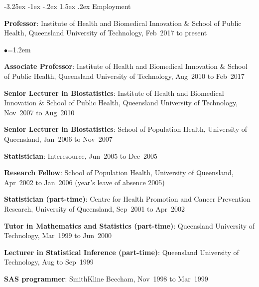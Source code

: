 \documentclass[a4paper,11pt]{article}
\makeatletter
\renewcommand\subsection{\@startsection{subsection}{2}{\z@}%
                                       {-3.25ex \@plus -1ex \@minus -.2ex}%
                                       {1.5ex \@plus .2ex}%
                                   {\normalfont\normalsize\bfseries\color{blue}}}
\renewcommand{\labelitemi}{$\bullet$}
\makeatother
\begin{document}
\begin{raggedright}
\subsection{Employment}

\textbf{Professor}: Institute of Health and Biomedical Innovation \& School of Public Health, Queensland University of Technology, Feb~2017 to present

\begin{list}{\labelitemi}{\leftmargin=1.2em}\addtolength{\itemsep}{-0.5\baselineskip}
\item \textbf{Associate Professor}: Institute of Health and Biomedical Innovation \& School of Public Health, Queensland University of Technology, Aug~2010 to Feb~2017

\item \textbf{Senior Lecturer in Biostatistics}: Institute of Health and Biomedical Innovation \& School of Public Health, Queensland University of Technology, Nov~2007 to Aug~2010

\item \textbf{Senior Lecturer in Biostatistics}: School of Population Health, University of Queensland, Jan~2006 to Nov~2007

\item \textbf{Statistician}: Interesource, Jun~2005 to Dec~2005

\item \textbf{Research Fellow}: School of Population Health, University of Queensland, Apr~2002 to Jan~2006 (year's leave of absence 2005)

\item \textbf{Statistician (part-time)}: Centre for Health Promotion and Cancer Prevention Research, University of Queensland, Sep~2001 to Apr~2002

\item \textbf{Tutor in Mathematics and Statistics (part-time)}: Queensland University of Technology, Mar~1999 to Jun~2000

\item \textbf{Lecturer in Statistical Inference (part-time)}: Queensland University of Technology, Aug to Sep~1999


\item \textbf{SAS programmer}: SmithKline Beecham, Nov~1998 to Mar~1999


\end{list}
\end{raggedright}
\end{document}

